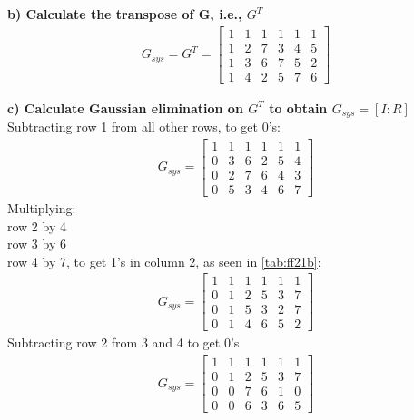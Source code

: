 \noindent\textbf{b) Calculate the transpose of G, i.e., $G^T$}\\
\begin{align}
    G_{sys} = G^T = 
    \begin{bmatrix}
        1 & 1 & 1 & 1 & 1 & 1 \\
        1 & 2 & 7 & 3 & 4 & 5 \\
        1 & 3 & 6 & 7 & 5 & 2 \\
        1 & 4 & 2 & 5 & 7 & 6 
    \end{bmatrix}
\end{align}

\noindent\textbf{c) Calculate Gaussian elimination on $G^T$ to obtain $G_{sys} = [I : R]$}\\
Subtracting row 1 from all other rows, to get 0's: \\
\begin{align}
    G_{sys} = 
    \begin{bmatrix}
        1 & 1 & 1 & 1 & 1 & 1 \\
        0 & 3 & 6 & 2 & 5 & 4 \\
        0 & 2 & 7 & 6 & 4 & 3 \\
        0 & 5 & 3 & 4 & 6 & 7 
    \end{bmatrix}
\end{align}
Multiplying: \\row 2 by 4 \\row 3 by 6 \\row 4 by 7, to get 1's in column 2, as seen in \ref{tab:ff21b}: \\
\begin{align}
    G_{sys} = 
    \begin{bmatrix}
        1 & 1 & 1 & 1 & 1 & 1 \\
        0 & 1 & 2 & 5 & 3 & 7 \\
        0 & 1 & 5 & 3 & 2 & 7 \\
        0 & 1 & 4 & 6 & 5 & 2 
    \end{bmatrix}
\end{align}
Subtracting row 2 from 3 and 4 to get 0's \\
\begin{align}
    G_{sys} = 
    \begin{bmatrix}
        1 & 1 & 1 & 1 & 1 & 1 \\
        0 & 1 & 2 & 5 & 3 & 7 \\
        0 & 0 & 7 & 6 & 1 & 0 \\
        0 & 0 & 6 & 3 & 6 & 5 
    \end{bmatrix}
\end{align}
